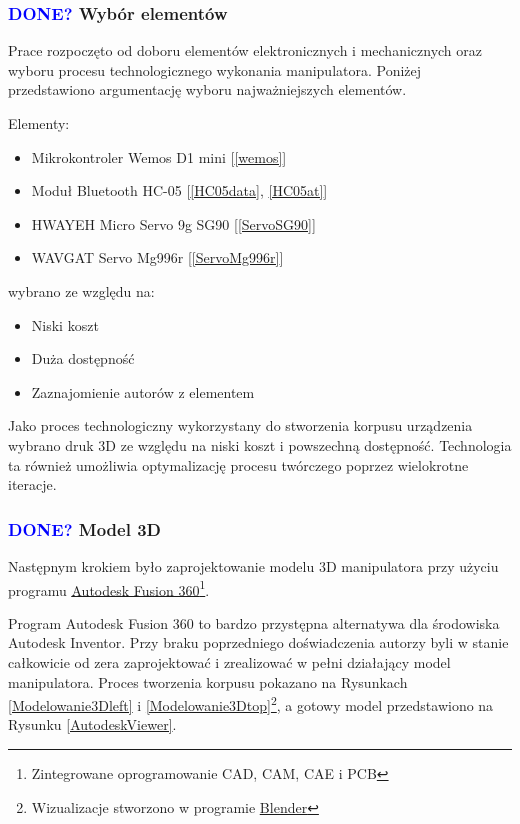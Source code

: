 \documentclass[11pt,titlepage,a4paper]{article}
\begin{document}
\subsubsection{\textcolor{blue}{DONE?} Wybór elementów}

Prace rozpoczęto od doboru elementów elektronicznych i mechanicznych oraz wyboru procesu technologicznego wykonania manipulatora. Poniżej przedstawiono argumentację wyboru najważniejszych elementów.

\medskip

Elementy:
\begin{itemize}
    \item Mikrokontroler Wemos D1 mini [\ref{wemos}]
    \item Moduł Bluetooth HC-05 [\ref{HC05data}, \ref{HC05at}]
    \item HWAYEH Micro Servo 9g SG90 [\ref{ServoSG90}]
    \item WAVGAT Servo Mg996r [\ref{ServoMg996r}]
\end{itemize}
wybrano ze względu na:
\begin{itemize}
    \item Niski koszt
    \item Duża dostępność
    \item Zaznajomienie autorów z elementem
\end{itemize}

\medskip

Jako proces technologiczny wykorzystany do stworzenia korpusu urządzenia wybrano druk 3D ze względu na niski koszt i powszechną dostępność. Technologia ta również umożliwia optymalizację procesu twórczego poprzez wielokrotne iteracje.

\newpage

\subsubsection{\textcolor{blue}{DONE?} Model 3D}

Następnym krokiem było zaprojektowanie modelu 3D manipulatora przy użyciu programu \href{https://www.autodesk.pl/products/fusion-360}{\underline{Autodesk Fusion 360}\footnote{Zintegrowane oprogramowanie CAD, CAM, CAE i PCB}}.

Program Autodesk Fusion 360 to bardzo przystępna alternatywa dla środowiska Autodesk Inventor. Przy braku poprzedniego doświadczenia autorzy byli w stanie całkowicie od zera zaprojektować i zrealizować w pełni działający model manipulatora. Proces tworzenia korpusu pokazano na Rysunkach \ref{Modelowanie3Dleft} i \ref{Modelowanie3Dtop}\footnote{Wizualizacje stworzono w programie \href{https://www.blender.org}{\underline{Blender}}}, a gotowy model przedstawiono na Rysunku \ref{AutodeskViewer}.
\end{document}
